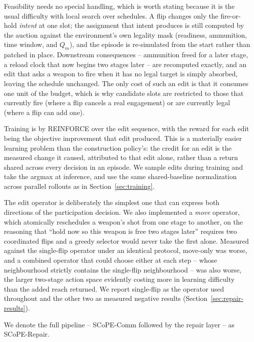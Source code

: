 Feasibility needs no special handling, which is worth stating because it is the usual difficulty with local search over schedules. A flip changes only the fire-or-hold \emph{intent} at one slot; the assignment that intent produces is still computed by the auction against the environment's own legality mask (readiness, ammunition, time window, and $Q_m$), and the episode is re-simulated from the start rather than patched in place. Downstream consequences -- ammunition freed for a later stage, a reload clock that now begins two stages later -- are recomputed exactly, and an edit that asks a weapon to fire when it has no legal target is simply absorbed, leaving the schedule unchanged. The only cost of such an edit is that it consumes one unit of the budget, which is why candidate slots are restricted to those that currently fire (where a flip cancels a real engagement) or are currently legal (where a flip can add one).

Training is by REINFORCE over the edit sequence, with the reward for each edit being the objective improvement that edit produced. This is a materially easier learning problem than the construction policy's: the credit for an edit is the measured change it caused, attributed to that edit alone, rather than a return shared across every decision in an episode. We sample edits during training and take the argmax at inference, and use the same shared-baseline normalization across parallel rollouts as in Section~\ref{sec:training}.

The edit operator is deliberately the simplest one that can express both directions of the participation decision. We also implemented a \emph{move} operator, which atomically reschedules a weapon's shot from one stage to another, on the reasoning that ``hold now so this weapon is free two stages later'' requires two coordinated flips and a greedy selector would never take the first alone. Measured against the single-flip operator under an identical protocol, move-only was worse, and a combined operator that could choose either at each step -- whose neighbourhood strictly contains the single-flip neighbourhood -- was also worse, the larger two-stage action space evidently costing more in learning difficulty than the added reach returned. We report single-flip as the operator used throughout and the other two as measured negative results (Section~\ref{sec:repair-results}).

We denote the full pipeline -- SCoPE-Comm followed by the repair layer -- as SCoPE-Repair.

